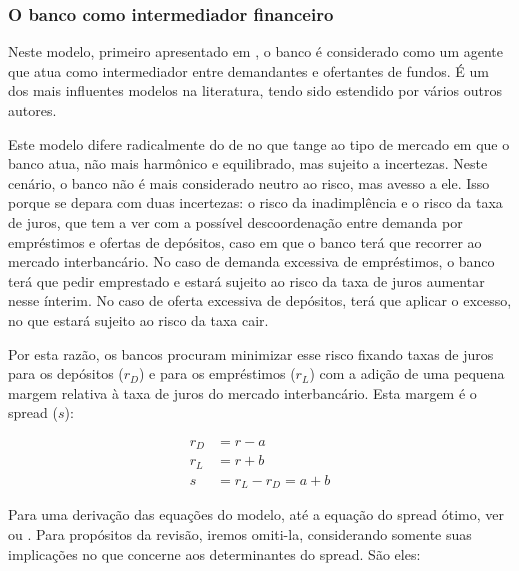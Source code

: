 \documentclass[a4paper,
               article,
               12pt,
               openany,
               oneside,
               english,
               brazil]{abntex2}
\numberwithin{equation}{section}
\begin{document}
\subsubsection{O banco como intermediador financeiro}

    Neste modelo, primeiro apresentado em \textcite{hoesaunders}, o banco é considerado como um agente que atua como intermediador entre demandantes e ofertantes de fundos. É um dos mais influentes modelos na literatura, tendo sido estendido por vários outros autores.

    Este modelo difere radicalmente do de \textcite{klein} no que tange ao tipo de mercado em que o banco atua, não mais harmônico e equilibrado, mas sujeito a incertezas. Neste cenário, o banco não é mais considerado neutro ao risco, mas avesso a ele. Isso porque se depara com duas incertezas: o risco da inadimplência e o risco da taxa de juros, que tem a ver com a possível descoordenação entre demanda por empréstimos e ofertas de depósitos, caso em que o banco terá que recorrer ao mercado interbancário. No caso de demanda excessiva de empréstimos, o banco terá que pedir emprestado e estará sujeito ao risco da taxa de juros aumentar nesse ínterim. No caso de oferta excessiva de depósitos, terá que aplicar o excesso, no que estará sujeito ao risco da taxa cair. \textcite[p.~2262]{maudos}

    Por esta razão, os bancos procuram minimizar esse risco fixando taxas de juros para os depósitos ($r_D$) e para os empréstimos ($r_L$) com a adição de uma pequena margem relativa à taxa de juros do mercado interbancário. Esta margem é o spread ($s$):

	\begin{align}
        r_D &= r - a \\
        r_L &= r + b \\
        s &= r_L - r_D = a + b
	\end{align}

    Para uma derivação das equações do modelo, até a equação do spread ótimo, ver \textcite[p.~2262]{maudos} ou \textcite[p.~584]{hoesaunders}. Para propósitos da revisão, iremos omiti-la, considerando somente suas implicações no que concerne aos determinantes do spread. São eles:
\end{document}
